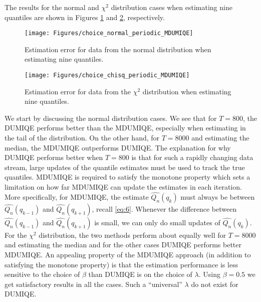 \documentclass[10pt, a4paper]{article}
\newtheorem{rational for conjecture}{Rational for Conjecture}
\begin{document}
The results for the normal and $\chi^2$ distribution cases when estimating nine quantiles are shown in Figures \ref{fig:5} and \ref{fig:2}, respectively.
\begin{figure}
  \centering
  \texttt{[image: Figures/choice\_normal\_periodic\_MDUMIQE]}
  \caption{Estimation error for data from the normal distribution when estimating nine quantiles.}
  \label{fig:5}
\end{figure}
\begin{figure}
  \centering
  \texttt{[image: Figures/choice\_chisq\_periodic\_MDUMIQE]}
  \caption{Estimation error for data from the $\chi^2$ distribution when estimating nine quantiles.}
  \label{fig:2}
\end{figure}
We start by discussing the normal distribution cases. We see that for $T = 800$, the DUMIQE performs better than the MDUMIQE, especially when estimating in the tail of the distribution. On the other hand, for $T=8000$ and estimating the median, the MDUMIQE outperforms DUMIQE. The explanation for why DUMIQE performs better when $T=800$ is that for such a rapidly changing data stream, large updates of the quantile estimates must be used to track the true quantiles. MDUMIQE is required to satisfy the monotone property which sets a limitation on how far MDUMIQE can update the estimates in each iteration. More specifically, for MDUMIQE, the estimate $\widehat{Q_{n}}(q_{k})$ must always be between $\widehat{Q_{n}}(q_{k-1})$ and $\widehat{Q_{n}}(q_{k+1})$, recall \eqref{eq:6}. Whenever the difference between $\widehat{Q_{n}}(q_{k-1})$ and $\widehat{Q_{n}}(q_{k+1})$ is small,  we can only do small updates of $\widehat{Q_{n}}(q_{k})$.
For the $\chi^2$ distribution, the two methods perform about equally well for $T=8000$ and estimating the median and for the other cases DUMIQE performs better MDUMIQE. An appealing property of the MDUMIQE approach (in addition to satisfying the monotone property) is that the estimation performance is less sensitive to the choice of $\beta$ than DUMIQE is on the choice of $\lambda$. Using $\beta = 0.5$ we get satisfactory results in all the cases. Such a ``universal'' $\lambda$ do not exist for DUMIQE.
\end{document}
